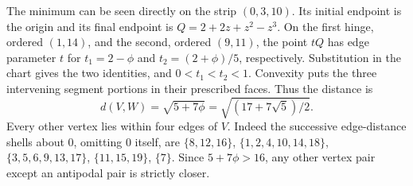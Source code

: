 The minimum can be seen directly on the strip $(0,3,10)$. Its initial
endpoint is the origin and its final endpoint is
$Q=2+2z+z^2-z^3$. On the first hinge, ordered $(1,14)$, and the second,
ordered $(9,11)$, the point $tQ$ has edge parameter $t$ for
$t_1=2-\phi$ and $t_2=(2+\phi)/5$, respectively. Substitution in the
chart gives the two identities, and $0<t_1<t_2<1$. Convexity puts the
three intervening segment portions in their prescribed faces. Thus the
distance is
\[
 d(V,W)=\sqrt{5+7\phi}=\sqrt{(17+7\sqrt5)/2}.
\]
Every other vertex lies within four edges of $V$. Indeed the successive
edge-distance shells about $0$, omitting $0$ itself, are
$\{8,12,16\}$, $\{1,2,4,10,14,18\}$, $\{3,5,6,9,13,17\}$,
$\{11,15,19\}$, $\{7\}$. Since $5+7\phi>16$, any other vertex pair
except an antipodal pair is strictly closer.
